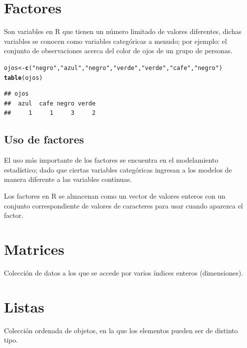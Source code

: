 \documentclass[11pt,a4paper,oneside]{book}\usepackage[]{graphicx}\usepackage[]{color}
\makeatletter
\newcommand{\hlstr}[1]{\textcolor[rgb]{0.192,0.494,0.8}{#1}}%
\newcommand{\hlstd}[1]{\textcolor[rgb]{0.345,0.345,0.345}{#1}}%
\newcommand{\hlkwb}[1]{\textcolor[rgb]{0.69,0.353,0.396}{#1}}%
\newcommand{\hlkwd}[1]{\textcolor[rgb]{0.737,0.353,0.396}{\textbf{#1}}}%
\newenvironment{kframe}{%
 \def\at@end@of@kframe{}%
 \ifinner\ifhmode%
  \def\at@end@of@kframe{\end{minipage}}%
  \begin{minipage}{\columnwidth}%
 \fi\fi%
 \def\FrameCommand##1{\hskip\@totalleftmargin \hskip-\fboxsep
 \colorbox{shadecolor}{##1}\hskip-\fboxsep
     \hskip-\linewidth \hskip-\@totalleftmargin \hskip\columnwidth}%
 \MakeFramed {\advance\hsize-\width
   \@totalleftmargin\z@ \linewidth\hsize
   \@setminipage}}%
 {\par\unskip\endMakeFramed%
 \at@end@of@kframe}
\newenvironment{knitrout}{}{} %
\makeatother
\begin{document}
\begin{itemize}
\section{Factores}
Son variables en R que tienen un número limitado de valores diferentes, dichas variables se conocen como variables categóricas a menudo; por ejemplo: el conjunto de observaciones acerca del color de ojos de un grupo de personas. 

\begin{knitrout}
\color{fgcolor}\begin{kframe}
\begin{alltt}
\hlstd{ojos} \hlkwb{<-} \hlkwd{c}\hlstd{(}\hlstr{"negro"}\hlstd{,} \hlstr{"azul"}\hlstd{,} \hlstr{"negro"}\hlstd{,} \hlstr{"verde"}\hlstd{,} \hlstr{"verde"}\hlstd{,} \hlstr{"cafe"}\hlstd{,} \hlstr{"negro"}\hlstd{)}
\hlkwd{table}\hlstd{(ojos)}
\end{alltt}
\begin{verbatim}
## ojos
##  azul  cafe negro verde 
##     1     1     3     2
\end{verbatim}
\end{kframe}
\end{knitrout}



\subsection{Uso de factores}
El uso más importante de los factores se encuentra en el modelamiento estadístico; dado que ciertas variables categóricas ingresan a los modelos de manera diferente a las variables continuas.

Los factores en R se almacenan como un vector de valores enteros con un conjunto correspondiente de valores de caracteres para usar cuando aparezca el factor.



\section{Matrices}
Colección de datos a los que se accede por varios índices enteros (dimensiones).

\section{Listas}
Colección ordenada de objetos, en la que los elementos pueden ser de distinto tipo.


\end{itemize}
\end{document}
